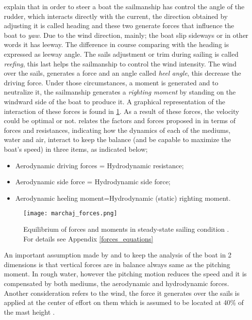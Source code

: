 \cite{philpott1993yacht}  explain that in order to steer a boat the sailmanship has control the angle of the rudder, which interacts directly with the current, the direction obtained by adjusting it is called heading and these two generate forces that influence the boat to \textit{yaw}. Due to the wind direction, mainly; the boat slip sideways or in other words it has leeway. The difference in course comparing with the heading is expressed as leeway angle. The sails adjustment or trim during sailing is called \textit{reefing}, this last helps the sailmanship to control the wind intensity.  The wind over the sails, generates a force and an angle called \textit{heel angle}, this decrease the driving force. Under those circumstances, a moment is generated and to neutralize it, the sailmanship generates a \textit{righting moment} by standing on the windward side of the boat to produce it. A graphical representation of the interaction of these forces is  found in \ref{forces_m}.  As a result of these forces, the velocity could be optimal or not. \cite{larsonprinciples} relates the factors and forces proposed in\cite{philpott1993yacht} in terms of forces and resistances, indicating how the dynamics of each of the mediums, water and air,  interact to keep the balance (and be capable to maximize the boat's speed)  in three items, as indicated below; 
\begin{itemize}  \label{milgramforces}
 \setlength \itemsep{0em}
\item Aerodynamic driving forces = Hydrodynamic resistance;
\item Aerodynamic side force = Hydrodynamic side force;
\item Aerodynamic heeling moment=Hydrodynamic (static) righting moment.
\end{itemize}

 \begin{figure}[ht]
\centering
  \texttt{[image: marchaj\_forces.png]}
 \caption{Equilibrium of forces and moments in steady-state sailing condition \cite{marchajaereo1979}. For details see Appendix \ref{forces_equations} }
\label{forces_m}
\end{figure}

An important assumption made by  \cite{philpott1993yacht} and \cite{larsonprinciples} to keep the analysis of the boat in 2 dimensions is that vertical forces are in balance always same as the pitching moment. In rough water, however the pitching motion reduces the speed and it is compensated by both mediums, the aerodynamic and hydrodynamic forces. Another consideration refers to the wind, the force it generates over the sails is applied at  the center of effort on them which is assumed to be located at 40\% of the mast height \cite{philpott1993yacht}. \par

